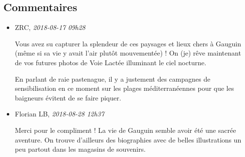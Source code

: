 \hypertarget{commentaires}{%
\subsection{Commentaires}\label{commentaires}}

\begin{itemize}
\item
  ZRC, \emph{2018-08-17 09h28}

  Vous avez su capturer la splendeur de ces paysages et lieux chers à
  Gauguin (même si sa vie y avait l'air plutôt mouvementée) ! On (je)
  rêve maintenant de vos futures photos de Voie Lactée illuminant le
  ciel nocturne.

  En parlant de raie pastenague, il y a justement des campagnes de
  sensibilisation en ce moment sur les plages méditerranéennes pour que
  les baigneurs évitent de se faire piquer.
\item
  Florian LB, \emph{2018-08-28 12h37}

  Merci pour le compliment ! La vie de Gauguin semble avoir été une
  sacrée aventure. On trouve d'ailleurs des biographies avec de belles
  illustrations un peu partout dans les magasins de souvenirs.
\end{itemize}
